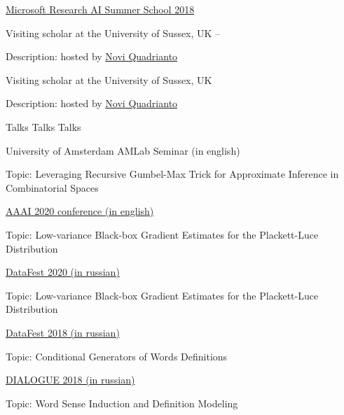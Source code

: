 \documentclass[letterpaper,MMMyyyy,nonstopmode]{simpleresumecv}
\begin{document}
\begin{Body}
\Gap
\BulletItem
\href{https://www.microsoft.com/en-us/research/event/ai-summer-school-2018/}{Microsoft Research AI Summer School 2018}
\hfill
{}

\BulletItem Visiting scholar at the University of Sussex, UK
\hfill
{} --
\begin{Detail}
\Item
Description: hosted by \href{http://www.sussex.ac.uk/profiles/335583}{Novi Quadrianto}
\end{Detail}

\BulletItem Visiting scholar at the University of Sussex, UK
\hfill
{}
\begin{Detail}
\Item
Description: hosted by \href{http://www.sussex.ac.uk/profiles/335583}{Novi Quadrianto}
\end{Detail}



\Section
{Talks}
{Talks}
{Talks}

\Item
University of Amsterdam AMLab Seminar (in english)
\hfill
{}
\begin{Detail}
\Item
Topic: Leveraging Recursive Gumbel-Max Trick for Approximate Inference in Combinatorial Spaces
\end{Detail}

\Item
\href{https://aaai.org/Conferences/AAAI-20/}{AAAI 2020 conference (in english)}
\hfill
{}
\begin{Detail}
\Item
Topic: Low-variance Black-box Gradient Estimates for the Plackett-Luce Distribution
\end{Detail}

\Item
\href{http://datafest.ru}{DataFest 2020 (in russian)}
\hfill
{}
\begin{Detail}
\Item
Topic: Low-variance Black-box Gradient Estimates for the Plackett-Luce Distribution
\end{Detail}

\Item
\href{http://datafest.ru}{DataFest 2018 (in russian)}
\hfill
{}
\begin{Detail}
\Item
Topic: Conditional Generators of Words Definitions
\end{Detail}

\Gap
\Item
\href{http://www.dialog-21.ru/en/}{DIALOGUE 2018 (in russian)}
\hfill
{}
\begin{Detail}
\Item
Topic: Word Sense Induction and Definition Modeling
\end{Detail}




\end{Body}
\end{document}
